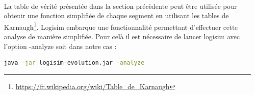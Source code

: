 \documentclass{article}
\begin{document}
    \paragraph{}
    La table de vérité présentée dans la section précèdente peut être utilisée pour obtenir une fonction simplifiée de chaque segment en utilisant les tables de Karnaugh\footnote{\url{https://fr.wikipedia.org/wiki/Table_de_Karnaugh}}.
    Logisim embarque une fonctionnalité permettant d'effectuer cette analyse de manière simplifiée.
    Pour celà il est nécessaire de lancer logisim avec l'option -analyze soit dans notre cas :

    \begin{lstlisting}[language=bash]
java -jar logisim-evolution.jar -analyze
    \end{lstlisting}
\end{document}
